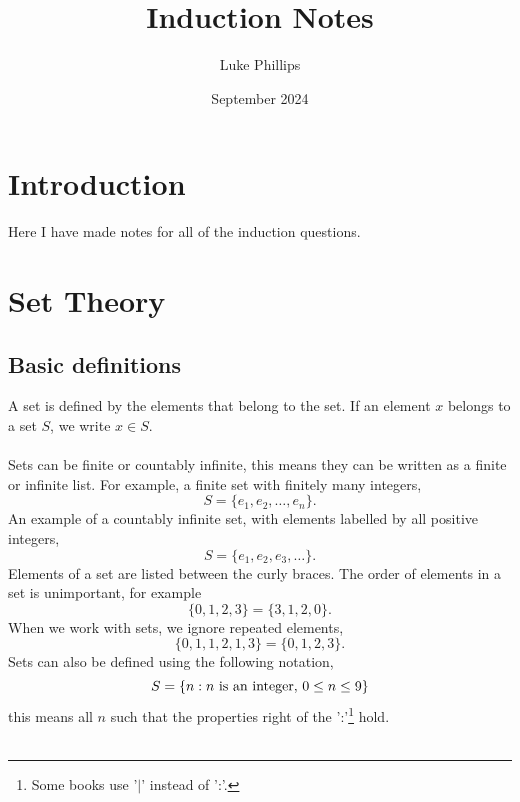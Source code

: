 \documentclass[10pt, a4paper]{article}
\title{Induction Notes}
\author{Luke Phillips}
\date{September 2024}
\begin{document}
\maketitle

\newpage

\tableofcontents

\newpage

\section{Introduction}
Here I have made notes for all of the induction questions.

\section{Set Theory}

\subsection{Basic definitions}
A set is defined by the elements that belong to the set. If an element $x$ belongs to a set $S$, we write $x \in S$. \\
\\
Sets can be finite or countably infinite, this means they can be written as a finite or infinite list. For example, a finite set with finitely many integers, 
\[
S = \{e_1, e_2,\dotsc,e_n\}.
\]
An example of a countably infinite set, with elements labelled by all positive integers,
\[
S = \{e_1, e_2, e_3, \dotsc\}.
\]
Elements of a set are listed between the curly braces. The order of elements in a set is unimportant, for example
\[
\{0, 1, 2, 3\} = \{3, 1, 2, 0\}.
\]
When we work with sets, we ignore repeated elements,
\[
\{0, 1, 1, 2, 1, 3\} = \{0, 1, 2, 3\}.
\]
Sets can also be defined using the following notation,
\[
S = \{n : n \textnormal{ is an integer},\,0 \leq n \leq 9\}
\]
this means all $n$ such that the properties right of the ':'\footnote{Some books use '$\mid$' instead of ':'.} hold. \\
\\
\end{document}
